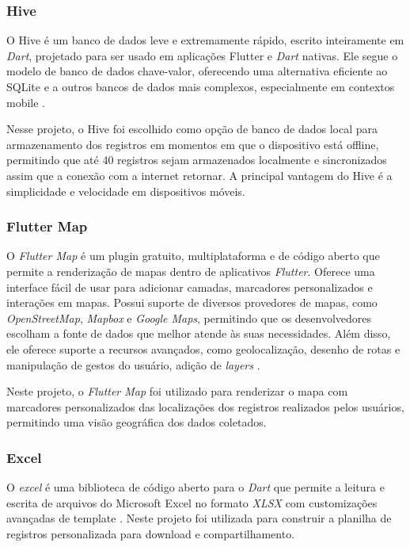 \subsubsection{Hive}

O Hive é um banco de dados leve e extremamente rápido, escrito inteiramente 
em \textit{Dart}, projetado para ser usado em aplicações Flutter e 
\textit{Dart} nativas. Ele segue o modelo de banco de dados chave-valor, 
oferecendo uma alternativa eficiente ao SQLite e a outros bancos de dados 
mais complexos, especialmente em contextos mobile \cite{hive2025}.

Nesse projeto, o Hive foi escolhido como opção de banco de dados local para armazenamento dos registros em momentos em que o dispositivo está offline, 
permitindo que até 40 registros sejam armazenados localmente e sincronizados assim que a conexão com a internet retornar.
A principal vantagem do Hive é a simplicidade e velocidade em dispositivos móveis.

\subsubsection{Flutter Map}
O \textit{Flutter Map} é um plugin gratuito, multiplataforma e de código aberto
que permite a renderização de mapas 
dentro de aplicativos \textit{Flutter}. Oferece uma interface fácil de usar 
para adicionar camadas, marcadores personalizados e interações em mapas.
Possui suporte de diversos provedores de mapas, como
\textit{OpenStreetMap}, \textit{Mapbox} e \textit{Google Maps}, 
permitindo que os desenvolvedores 
 escolham a fonte de dados que melhor atende às suas necessidades. 
 Além disso, ele oferece suporte a recursos avançados, como 
 geolocalização, desenho de rotas e manipulação de gestos do 
 usuário, adição de \textit{layers} \cite{flutter_map_doc}.
 
 Neste projeto, o \textit{Flutter Map} foi utilizado para renderizar o mapa
 com marcadores personalizados das localizações dos registros realizados 
 pelos usuários, permitindo uma visão geográfica dos dados coletados.

\subsubsection{Excel}

O \textit{excel} é uma biblioteca de código aberto para o
\textit{Dart} que permite a leitura e escrita de arquivos do Microsoft Excel 
no formato \textit{XLSX} com customizações avançadas de template \cite{excel_flutter}.
Neste projeto foi utilizada para construir a planilha de registros personalizada para download e compartilhamento.

